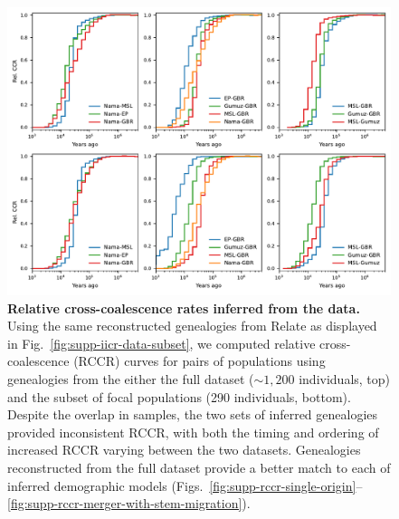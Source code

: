 \documentclass[]{article}
\begin{document}
\begin{figure}[ht]
    \centering
    \includegraphics[width=\textwidth]{figures/supp-relate-rccr-data-full-and-subset}
    \caption{
        \textbf{Relative cross-coalescence rates inferred from the data.} Using
        the same reconstructed genealogies from Relate as displayed in
        Fig.~\ref{fig:supp-iicr-data-subset}, 
        we computed relative cross-coalescence (RCCR) curves
        for pairs of populations using genealogies from the either the full dataset
        ($\sim1,200$ individuals, top) and the subset of focal populations (290
        individuals, bottom). Despite the overlap in samples, the two sets of inferred
        genealogies provided inconsistent RCCR, with both the timing and
        ordering of increased RCCR varying between the two datasets.
        Genealogies reconstructed from the full dataset provide a better match
        to each of inferred demographic models
        (Figs.~\ref{fig:supp-rccr-single-origin}--\ref{fig:supp-rccr-merger-with-stem-migration}).
    }
    \label{fig:supp-rccr-data}
\end{figure}
\end{document}
